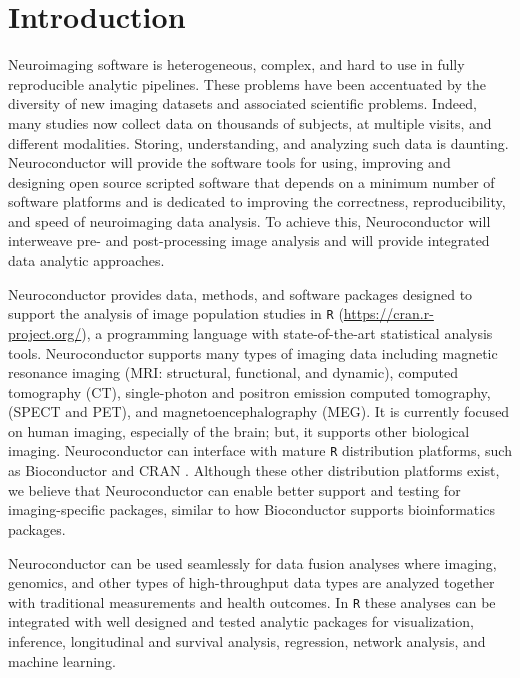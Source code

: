 \documentclass[]{elsarticle} %
\newcommand{\rlang}{\texttt{R}}
\begin{document}
\section{Introduction}\label{introduction}

Neuroimaging software is heterogeneous, complex, and hard to use in fully reproducible analytic pipelines. These problems have been accentuated by the diversity of new imaging datasets and associated scientific problems. Indeed, many studies now collect data on thousands of subjects, at multiple visits, and different modalities. Storing, understanding, and analyzing such data is  daunting.  Neuroconductor will provide the software tools for using, improving and designing open source scripted software that depends on a minimum number of software platforms and is dedicated to improving the correctness, reproducibility, and speed of neuroimaging data analysis. To achieve this, Neuroconductor will interweave pre- and post-processing image analysis and will provide integrated data analytic approaches.


Neuroconductor provides data, methods, and software packages designed to support the analysis of image population studies in {\rlang} (\url{https://cran.r-project.org/}), a programming language with state-of-the-art statistical analysis tools. Neuroconductor supports many types of imaging data including magnetic resonance imaging (MRI: structural, functional, and dynamic), computed tomography (CT), single-photon and positron emission computed tomography, (SPECT and PET), and magnetoencephalography (MEG). It is currently focused on human imaging, especially of the brain; but, it supports other biological imaging.  Neuroconductor can interface with mature {\rlang} distribution platforms, such as Bioconductor \cite{bioc1,bioc2} and CRAN \cite{Hornik2016,r}.  Although these other distribution platforms exist, we believe that Neuroconductor can enable better support and testing for imaging-specific packages, similar to how Bioconductor supports bioinformatics packages.  

Neuroconductor can be used seamlessly for data fusion analyses where imaging, genomics, and other types of high-throughput data types are analyzed together with traditional measurements and health outcomes. In {\rlang} these analyses can be integrated with well designed and tested analytic packages for visualization, inference, longitudinal and survival analysis, regression, network analysis, and machine learning.
\end{document}
